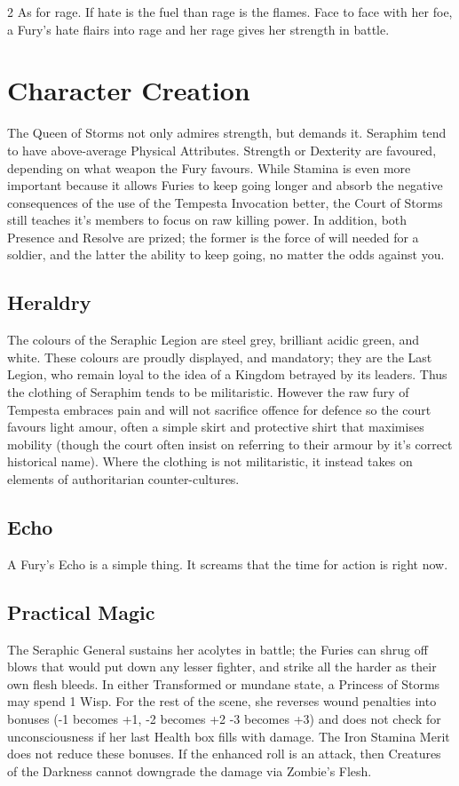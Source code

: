 \begin{multicols}{2}
As for rage. If hate is the fuel than rage is the flames. Face to face with her foe, a Fury's hate flairs into rage and her rage gives her strength in battle. 

\section*{Character Creation}
The Queen of Storms not only admires strength, but demands it. Seraphim tend to have above-average Physical Attributes. Strength or Dexterity are favoured, depending on what weapon the Fury favours. While Stamina is even more important because it allows Furies to keep going longer and absorb the negative consequences of the use of the Tempesta Invocation better, the Court of Storms still teaches it's members to focus on raw killing power. In addition, both Presence and Resolve are prized; the former is the force of will needed for a soldier, and the latter the ability to keep going, no matter the odds against you. 

\subsection*{Heraldry}
The colours of the Seraphic Legion are steel grey, brilliant acidic green, and white. These colours are proudly displayed, and mandatory; they are the Last Legion, who remain loyal to the idea of a Kingdom betrayed by its leaders. Thus the clothing of Seraphim tends to be militaristic. However the raw fury of Tempesta embraces pain and will not sacrifice offence for defence so the court favours light amour, often a simple skirt and protective shirt that maximises mobility (though the court often insist on referring to their armour by it's correct historical name). Where the clothing is not militaristic, it instead takes on elements of authoritarian counter-cultures. 


\subsection*{Echo}
A Fury's Echo is a simple thing. It screams that the time for action is right now. 

\subsection*{Practical Magic}
The Seraphic General sustains her acolytes in battle; the Furies can shrug off blows that would put down any lesser fighter, and strike all the harder as their own flesh bleeds. In either Transformed or mundane state, a Princess of Storms may spend 1 Wisp. For the rest of the scene, she reverses wound penalties into bonuses (-1 becomes +1, -2 becomes +2 -3 becomes +3) and does not check for unconsciousness if her last Health box fills with damage. The Iron Stamina Merit does not reduce these bonuses. If the enhanced roll is an attack, then Creatures of the Darkness cannot downgrade the damage via Zombie's Flesh. 


\end{multicols}
